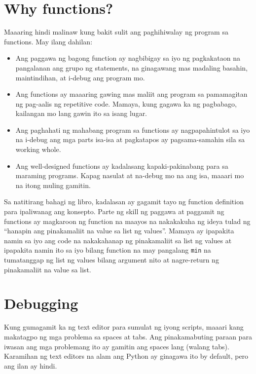 \documentclass[10pt,]{book}
\begin{document}
\section{Why functions?}\label{why-functions}


Maaaring hindi malinaw kung bakit sulit ang paghihiwalay ng program sa
functions. May ilang dahilan:

\begin{itemize}
\item
  Ang paggawa ng bagong function ay nagbibigay sa iyo ng pagkakataon na
  pangalanan ang grupo ng statements, na ginagawang mas madaling
  basahin, maintindihan, at i-debug ang program mo.
\item
  Ang functions ay maaaring gawing mas maliit ang program sa pamamagitan
  ng pag-aalis ng repetitive code. Mamaya, kung gagawa ka ng pagbabago,
  kailangan mo lang gawin ito sa isang lugar.
\item
  Ang paghahati ng mahabang program sa functions ay nagpapahintulot sa
  iyo na i-debug ang mga parts isa-isa at pagkatapos ay pagsama-samahin
  sila sa working whole.
\item
  Ang well-designed functions ay kadalasang kapaki-pakinabang para sa
  maraming programs. Kapag nasulat at na-debug mo na ang isa, maaari mo
  na itong muling gamitin.
\end{itemize}

Sa natitirang bahagi ng libro, kadalasan ay gagamit tayo ng function
definition para ipaliwanag ang konsepto. Parte ng skill ng paggawa at
paggamit ng functions ay magkaroon ng function na maayos na nakakakuha
ng ideya tulad ng ``hanapin ang pinakamaliit na value sa list ng
values''. Mamaya ay ipapakita namin sa iyo ang code na nakakahanap ng
pinakamaliit sa list ng values at ipapakita namin ito sa iyo bilang
function na may pangalang \texttt{min} na tumatanggap ng list ng values
bilang argument nito at nagre-return ng pinakamaliit na value sa list.

\section{Debugging}\label{debugging-3}


Kung gumagamit ka ng text editor para sumulat ng iyong scripts, maaari
kang makatagpo ng mga problema sa spaces at tabs. Ang pinakamabuting
paraan para iwasan ang mga problemang ito ay gamitin ang spaces lang
(walang tabs). Karamihan ng text editors na alam ang Python ay ginagawa
ito by default, pero ang ilan ay hindi.
\end{document}
